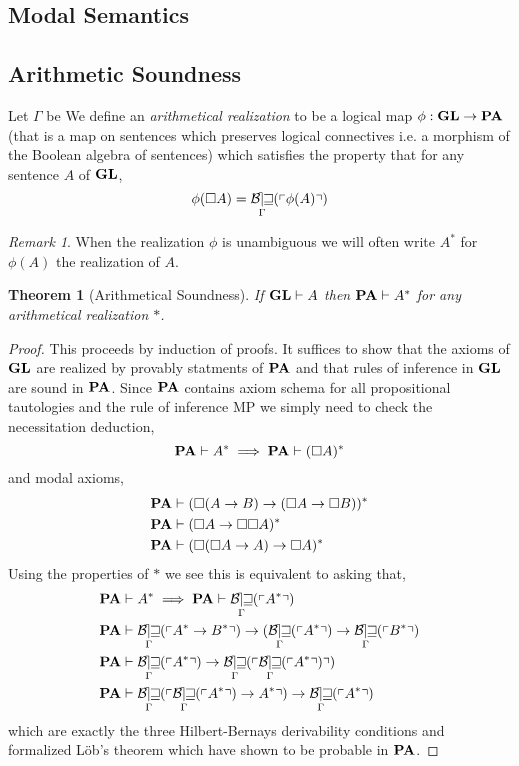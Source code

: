 \documentclass[12pt, leqno]{article}
\newcommand{\proves}{\vdash}
\newenvironment{definition}[1][Definition:]{\begin{trivlist}
\item[\hskip \labelsep {\bfseries #1}]}{\end{trivlist}}
\theoremstyle{theorem}
\newtheorem{theorem}{Theorem}[section]
\theoremstyle{definition}
\theoremstyle{definition}
\theoremstyle{remark}
\theoremstyle{definition}
\theoremstyle{remark}
\newtheorem{remark}{Remark}[subsection]
\DeclareMathOperator{\Bew}{\mathcal{B\mkern-2.0mu e\mkern-2.0mu w\mkern-1mu}}
\newcommand{\Gterm}[1]{\left\ulcorner #1 \right\urcorner}
\newcommand{\Thm}[1]{\Bew_{\Gamma}(\Gterm{#1})}
\begin{document}
\subsection{Modal Semantics}

\subsection{Arithmetic Soundness}

\begin{definition}
Let $\Gamma$ be We define an \textit{arithmetical realization} to be a logical map $\phi : \mathbf{GL} \to \mathbf{PA}$ (that is a map on sentences which preserves logical connectives i.e. a morphism of the Boolean algebra of sentences) which satisfies the property that for any sentence $A$ of $\mathbf{GL}$,
\[ \phi(\square A) = \Thm{\phi(A)} \]
\end{definition}

\begin{remark}
When the realization $\phi$ is unambiguous we will often write $A^*$ for $\phi(A)$ the realization of $A$.
\end{remark}

\begin{theorem}[Arithmetical Soundness]
If $\GL \proves A$ then $\PA \proves A^*$ for any arithmetical realization $*$.
\end{theorem}

\begin{proof}
This proceeds by induction of proofs. It suffices to show that the axioms of $\mathbf{GL}$ are realized by provably statments of $\mathbf{PA}$ and that rules of inference in $\mathbf{GL}$ are sound in $\mathbf{PA}$. Since $\mathbf{PA}$ contains axiom schema for all propositional tautologies and the rule of inference MP we simply need to check the necessitation deduction,
\[ \PA \proves A^* \implies \PA \proves (\square A)^* \]
and modal axioms,
\begin{align*}
\PA & \proves (\square (A \to B) \to (\square A \to \square B))^* 
\\
\PA & \proves (\square A \to \square \square A)^*
\\
\PA & \proves (\square (\square A \to A) \to \square A)^* 
\end{align*}
Using the properties of $*$ we see this is equivalent to asking that,
\begin{align*}
\PA & \proves A^* \implies \PA \proves \Thm{A^*}
\\
\PA & \proves \Thm{A^* \to B^*} \to (\Thm{A^*} \to \Thm{B^*}
\\
\PA & \proves \Thm{A^*} \to \Thm{\Thm{A^*}}
\\
\PA & \proves \Thm{\Thm{A^*} \to A^*} \to \Thm{A^*} 
\end{align*}
which are exactly the three Hilbert-Bernays derivability conditions and formalized L\"{o}b's theorem which have shown to be probable in $\mathbf{PA}$. 
\end{proof}
\end{document}
